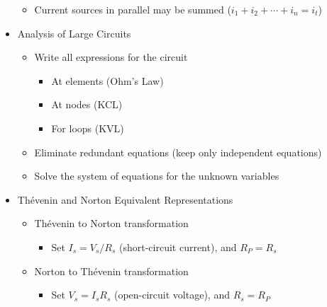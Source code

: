 \begin{itemize}
\begin{itemize}
      \item Current sources in parallel may be summed ($i_1+i_2+\cdots+i_n=i_t$)

    \end{itemize}

  \item Analysis of Large Circuits

    \begin{itemize}

      \item Write all expressions for the circuit

        \begin{itemize}

          \item At elements (Ohm's Law)

          \item At nodes (KCL)

          \item For loops (KVL)

        \end{itemize}

      \item Eliminate redundant equations (keep only independent equations)

      \item Solve the system of equations for the unknown variables

    \end{itemize}

  \item Th\'evenin and Norton Equivalent Representations

    \begin{itemize}

      \item Th\'evenin to Norton transformation

        \begin{itemize}

          \item Set $I_s=V_s/R_s$ (short-circuit current), and $R_P=R_s$

        \end{itemize}

      \item Norton to Th\'evenin transformation

        \begin{itemize}

          \item Set $V_s=I_sR_s$ (open-circuit voltage), and $R_s=R_P$


\end{itemize}
\end{itemize}
\end{itemize}
